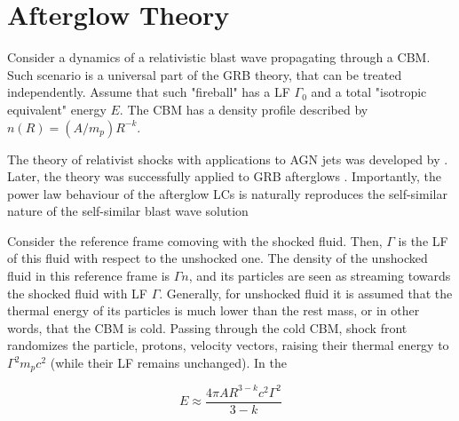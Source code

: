
\section{Afterglow Theory}

Consider a dynamics of a relativistic blast wave propagating through a \ac{CBM}. Such scenario is a universal part of the \ac{GRB} theory, that can be treated independently. 
Assume that such "fireball" has a \ac{LF} $\Gamma_0$ and a total "isotropic equivalent" energy $E$. The \ac{CBM} has a density profile described by $n(R) = (A/m_p)R^{-k}$.

The theory of relativist shocks with applications to \ac{AGN} jets was developed by \citep{Blandford:1976}. Later, the theory was successfully applied to \ac{GRB} afterglows \citep{Costa:1997cg,vanParadijs:1997wr,Frail:1997qf}.
Importantly, the power law behaviour of the afterglow \acp{LC} is naturally reproduces the self-similar nature of the self-similar blast wave solution



Consider the reference frame comoving with the shocked fluid. Then, $\Gamma$ is the \ac{LF} of this fluid with respect to the unshocked one. The density of the unshocked fluid in this reference frame is $\Gamma n$, and its particles are seen as streaming towards the shocked fluid with \ac{LF} $\Gamma$. Generally, for unshocked fluid it is assumed that the thermal energy of its particles is much lower than the rest mass, or in other words, that the \ac{CBM} is cold. 
Passing through the cold \ac{CBM}, shock front randomizes the particle, protons, velocity vectors, raising their thermal energy to $\Gamma^2 m_p c^2$ (while their \ac{LF} remains unchanged). 
In the 

\begin{equation}
E \approx \frac{4\pi A R^{3-k}c^2 \Gamma^2}{3-k}
\end{equation}


